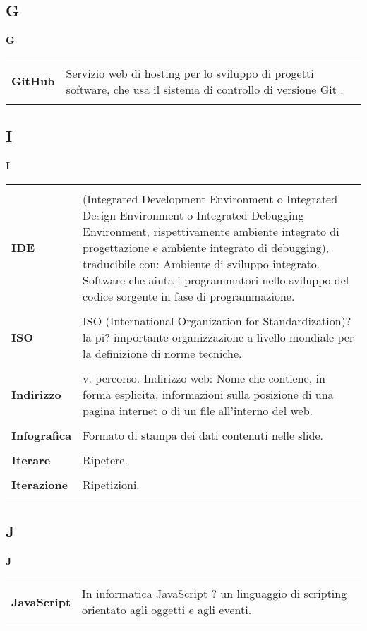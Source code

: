{\subsection{G} 
\hfill\Huge{\textbf{G}} \\ 
\normalsize 
\begin{longtabu} to 
\toprule \\ 
\textbf{GitHub} & Servizio web di hosting per lo sviluppo di progetti software, che usa il sistema di controllo di versione Git . \\ 
 \\ 
\end{longtabu} 
\newpage 
\subsection{I} 
\hfill\Huge{\textbf{I}} \\ 
\normalsize 
\begin{longtabu} to 
\toprule \\ 
\textbf{IDE} & (Integrated Development Environment o Integrated Design Environment o Integrated Debugging Environment, rispettivamente ambiente integrato di progettazione e ambiente integrato di debugging), traducibile con: Ambiente di sviluppo integrato. Software che aiuta i programmatori nello sviluppo del codice sorgente in fase di programmazione. \\ 
 \\ 
\textbf{ISO} & ISO (International Organization for Standardization)? la pi? importante organizzazione a livello mondiale per la definizione di norme tecniche. \\ 
 \\ 
\textbf{Indirizzo} & v. percorso. Indirizzo web: Nome che contiene, in forma esplicita, informazioni sulla posizione di una pagina internet o di un file all'interno del web. \\ 
 \\ 
\textbf{Infografica} & Formato di stampa dei dati contenuti nelle slide. \\ 
 \\ 
\textbf{Iterare} & Ripetere. \\ 
 \\ 
\textbf{Iterazione} & Ripetizioni. \\ 
 \\ 
\end{longtabu} 
\newpage 
\subsection{J} 
\hfill\Huge{\textbf{J}} \\ 
\normalsize 
\begin{longtabu} to 
\toprule \\ 
\textbf{JavaScript} & In informatica JavaScript ? un linguaggio di scripting orientato agli oggetti e agli eventi. \\ 
 \\ 
\end{longtabu} 
\newpage 
}

